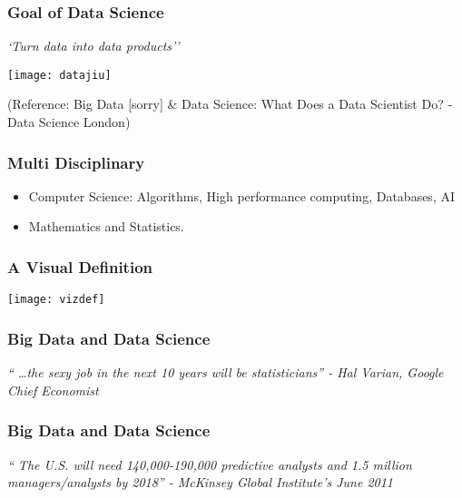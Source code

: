 \begin{frame}[fragile]\frametitle{Goal of Data Science}
\begin{center}
{\em `Turn data into data products''}

\texttt{[image: datajiu]}

\tiny{(Reference: Big Data [sorry] \& Data Science: What Does a Data Scientist Do? - Data Science London)}
\end{center}
\end{frame}

\begin{frame}[fragile]\frametitle{Multi Disciplinary}
\begin{itemize}
\item Computer Science: Algorithms, High performance computing, Databases, AI
\item Mathematics and Statistics.

\end{itemize}
\end{frame}

\begin{frame}[fragile]\frametitle{A Visual Definition}
\begin{center}
\texttt{[image: vizdef]}
\end{center}
\end{frame}

\begin{frame}[fragile]\frametitle{Big Data and Data Science}
\begin{center}
{\em `` \ldots the sexy job in the next 10 years will be statisticians'' - Hal Varian, Google Chief Economist}
\end{center}
\end{frame}

\begin{frame}[fragile]\frametitle{Big Data and Data Science}
\begin{center}
{\em `` The U.S. will need 140,000-190,000 predictive analysts and 1.5 million managers/analysts by 2018'' - McKinsey Global Institute's June 2011}
\end{center}
\end{frame}

